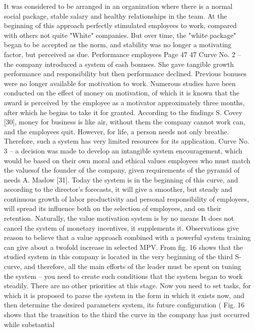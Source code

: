 It was considered to be arranged in an organization where there is a normal social package,
stable salary and healthy relationships in the team. At the beginning of this approach
perfectly stimulated employees to work, compared with others not quite
"White" companies. But over time, the "white package" began to be accepted as the norm, and
stability was no longer a motivating factor, but perceived as
due.
Performance
employees
Page 47
47
Curve No. 2 -- the company introduced a system of cash bonuses. She gave
tangible
growth
performance
and
responsibility
but
then
performance declined. Previous bonuses were no longer available for motivation
to work. Numerous studies have been conducted on the effect of money on motivation,
of which it is known that the award is perceived by the employee as a motivator approximately
three months, after which he begins to take it for granted. According to the findings
S. Covey [30], money for business is like air, without them the company cannot work
can, and the employees quit. However, for life, a person needs not only
breathe. Therefore, such a system has very limited resources for its
application.
Curve No. 3 -- a decision was made to develop an intangible system
encouragement, which would be based on their own moral and ethical values
employees who must match the values ​​of the founder of the company, given
requirements of the pyramid of needs A. Maslow [31]. Today the system is in
the beginning of this curve, and according to the director’s forecasts, it will give a smoother, but
steady and continuous growth of labor productivity and personal
responsibility of employees, will spread its influence both on the selection of employees,
and on their retention. Naturally, the value motivation system is by no means
It does not cancel the system of monetary incentives, it supplements it. Observations give
reason to believe that a value approach combined with a powerful system
training can give about a twofold increase in
selected MPV.
From fig. 16 shows that the studied system in this company is located in
the very beginning of the third S-curve, and therefore, all the main efforts of the leader
must be spent on tuning the system -- you need to create such conditions that
the system began to work steadily. There are no other priorities at this stage.
Now you need to set tasks, for which it is proposed to parse the system in
the form in which it exists now, and then determine the desired parameters
system, its future configuration ( Fig. 16 shows that the transition to the third
the curve in the company has just occurred while substantial
